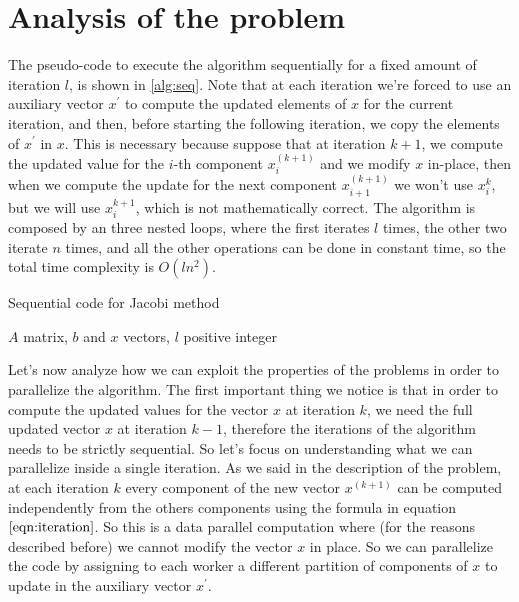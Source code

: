 \documentclass[12pt]{article}
\begin{document}
	\section{Analysis of the problem}
	The pseudo-code to execute the algorithm sequentially for a fixed amount of iteration $l$, is shown in \ref{alg:seq}. Note that at each iteration we're forced to use an auxiliary vector $x^\prime$ to compute the updated elements of $x$ for the current iteration, and then, before starting the following iteration, we copy the elements of $x^\prime$ in $x$. This is necessary because suppose that at iteration $k+1$, we compute the updated value for the $i$-th component $x^{(k+1)}_i$ and we modify $x$ in-place, then when we compute the update for the next component $x^{(k+1)}_{i+1}$ we won't use $x^{k}_i$, but we will use $x^{k+1}_i$, which is not mathematically correct. The algorithm is composed by an three nested loops, where the first iterates $l$ times, the other two iterate $n$ times, and all the other operations can be done in constant time, so the total time complexity is $O(ln^2)$.
	\begin{algorithm}[H]
		\caption{Sequential code for Jacobi method}\label{alg:seq}
		\begin{algorithmic}
			\Require $A$ matrix, $b$ and $x$ vectors, $l$ positive integer
			\EndFor
			\EndFor
			\EndFor
			\EndFor
		\end{algorithmic}
	\end{algorithm}
	Let's now analyze how we can exploit the properties of the problems in order to parallelize the algorithm. The first important thing we notice is that in order to compute the updated values for the vector $x$ at iteration $k$, we need the full updated vector $x$ at iteration $k-1$, therefore the iterations of the algorithm needs to be strictly sequential. So let's focus on understanding what we can parallelize inside a single iteration. As we said in the description of the problem, at each iteration $k$ every component of the new vector $x^{(k+1)}$ can be computed independently from the others components using the formula in equation $\ref{eqn:iteration}$. So this is a data parallel computation where (for the reasons described before) we cannot modify the vector $x$ in place. So we can parallelize the code by assigning to each worker a different partition of components of $x$ to update in the auxiliary vector $x^\prime$.\\
\end{document}
